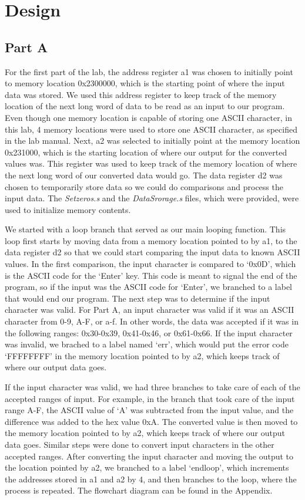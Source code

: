 \documentclass[letterpaper]{article}
\begin{document}
\section{Design}
  \subsection{Part A}
    For the first part of the lab, the address register a1 was chosen to initially point to
    memory location 0x2300000, which is the starting point of where the input data was stored.
    We used this address register to keep track of the memory location of the next long word
    of data to be read as an input to our program. Even though one memory location is capable
    of storing one ASCII character, in this lab, 4 memory locations were used to store one
    ASCII character, as specified in the lab manual.
    Next, a2 was selected to initially point at the memory location 0x231000, which is the
    starting location of where our output for the converted values was. This register
    was used to keep track of the memory location of where the next long word of
    our converted data would go. The data register d2 was chosen to temporarily store
    data so we could do comparisons and process the input data.
    The \textit{Setzeros.s} and the \textit{DataSrorage.s}
    files, which were provided, were used to initialize memory contents.

    We started with a loop branch that served as our main looping function. This
    loop first starts by moving data from a memory location pointed to by a1, to
    the data register d2 so that we could start comparing the input data to known ASCII values.
    In the first comparison, the input character is compared to `0x0D', which is the ASCII
    code for the `Enter' key. This code is meant to signal the end of the program, so if
    the input was the ASCII code for `Enter', we branched to a label that
    would end our program. The next step was to determine if the input character was valid.
    For Part A, an input character was valid if it was an ASCII character from 0-9, A-F, or a-f.
    In other words, the data was accepted if it was in the following ranges: 0x30-0x39,
    0x41-0x46, or 0x61-0x66. If the input character was invalid, we brached to a label
    named `err', which would put the error code `FFFFFFFF' in the memory location
    pointed to by a2, which keeps track of where our output data goes.

    If the input character was valid, we had three branches to take care of each
    of the accepted ranges of input. For example, in the branch that took care of the
    input range A-F, the ASCII value of `A' was subtracted from the input value, and
    the difference was added to the hex value 0xA. The converted value is then moved
    to the memory location pointed to by a2, which keeps track of where our output data goes.
    Similar steps were done to convert input characters in the other accepted ranges.
    After converting the input character and moving the output to the location pointed by a2,
    we branched to a label `endloop', which increments the addresses stored in a1 and a2 by 4,
    and then branches to the loop, where the process is repeated. The flowchart diagram can
    be found in the Appendix.
\end{document}
